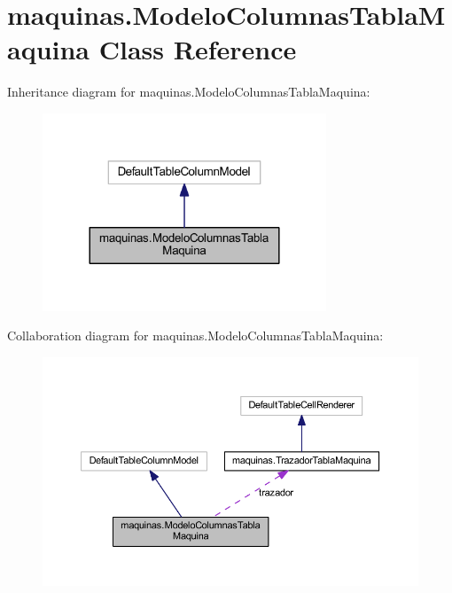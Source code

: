 \hypertarget{classmaquinas_1_1_modelo_columnas_tabla_maquina}{}\section{maquinas.\+Modelo\+Columnas\+Tabla\+Maquina Class Reference}
\label{classmaquinas_1_1_modelo_columnas_tabla_maquina}


Inheritance diagram for maquinas.\+Modelo\+Columnas\+Tabla\+Maquina\+:
\nopagebreak
\begin{figure}[H]
\begin{center}
\leavevmode
\includegraphics[width=240pt]{classmaquinas_1_1_modelo_columnas_tabla_maquina__inherit__graph}
\end{center}
\end{figure}


Collaboration diagram for maquinas.\+Modelo\+Columnas\+Tabla\+Maquina\+:
\nopagebreak
\begin{figure}[H]
\begin{center}
\leavevmode
\includegraphics[width=350pt]{classmaquinas_1_1_modelo_columnas_tabla_maquina__coll__graph}
\end{center}
\end{figure}

